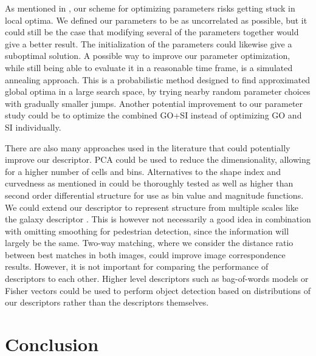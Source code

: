 \documentclass[thesis.tex]{subfiles}
\begin{document}
As mentioned in , our scheme for optimizing parameters risks getting stuck in local optima. We defined our parameters to be as uncorrelated as possible, but it could still be the case that modifying several of the parameters together would give a better result. The initialization of the parameters could likewise give a suboptimal solution. A possible way to improve our parameter optimization, while still being able to evaluate it in a reasonable time frame, is a simulated annealing approach. This is a probabilistic method designed to find approximated global optima in a large search space, by trying nearby random parameter choices with gradually smaller jumps. Another potential improvement to our parameter study could be to optimize the combined GO+SI instead of optimizing GO and SI individually.

There are also many approaches used in the literature that could potentially improve our descriptor. PCA could be used to reduce the dimensionality, allowing for a higher number of cells and bins. Alternatives to the shape index and curvedness as mentioned in  could be thoroughly tested as well as higher than second order differential structure for use as bin value and magnitude functions. We could extend our descriptor to represent structure from multiple scales like the galaxy descriptor . This is however not necessarily a good idea in combination with omitting smoothing for pedestrian detection, since the information will largely be the same. Two-way matching, where we consider the distance ratio between best matches in both images, could improve image correspondence results. However, it is not important for comparing the performance of descriptors to each other. Higher level descriptors such as bag-of-words models or Fisher vectors \cite{sanchez2013image} could be used to perform object detection based on distributions of our descriptors rather than the descriptors themselves.

\section{Conclusion}

\subbibliography
\end{document}
